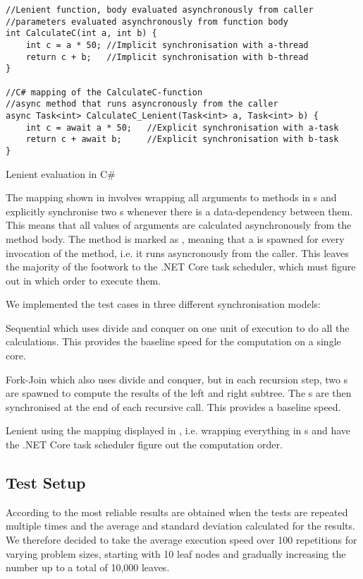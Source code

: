 \begin{listing}
\begin{verbatim}
//Lenient function, body evaluated asynchronously from caller
//parameters evaluated asynchronously from function body
int CalculateC(int a, int b) {
    int c = a * 50; //Implicit synchronisation with a-thread
    return c + b;   //Implicit synchronisation with b-thread
}

//C# mapping of the CalculateC-function
//async method that runs asyncronously from the caller
async Task<int> CalculateC_Lenient(Task<int> a, Task<int> b) {
    int c = await a * 50;   //Explicit synchronisation with a-task
    return c + await b;     //Explicit synchronisation with b-task
}
\end{verbatim}
\caption{Lenient evaluation in C\#} \label{lst:lenient:to:task}
\end{listing}
The mapping shown in  involves wrapping all arguments to methods in s and explicitly synchronise two s whenever there is a data-dependency between them. This means that all values of arguments are calculated asynchronously from the method body. The method is marked as , meaning that a  is spawned for every invocation of the method, i.e. it runs asyncronously from the caller. This leaves the majority of the footwork to the .NET Core task scheduler, which must figure out in which order to execute them.

We implemented the test cases in three different synchronisation models:
\begin{labeling}{\quad\quad}
    \item[Sequential] which uses divide and conquer on one unit of execution to do all the calculations. This provides the baseline speed for the computation on a single core.
    \item[Fork-Join] which also uses divide and conquer, but in each recursion step, two s are spawned to compute the results of the left and right subtree. The s are then synchronised at the end of each recursive call. This provides a \textit{} baseline speed.
    \item[Lenient] using the mapping displayed in , i.e. wrapping everything in s and have the .NET Core task scheduler figure out the computation order.
\end{labeling}

\subsection{Test Setup}
According to \cite{sestoft2013microbenchmarks} the most reliable results are obtained when the tests are repeated multiple times and the average and standard deviation calculated for the results. We therefore decided to take the average execution speed over 100 repetitions for varying problem sizes, starting with 10 leaf nodes and gradually increasing the number up to a total of 10,000 leaves. 


